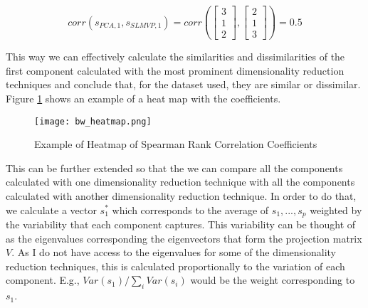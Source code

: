 $$
    corr(s_{PCA,1}, s_{SLMVP,1}) =
    corr \left(
    \begin{bmatrix}
            3 \\
            1 \\
            2
        \end{bmatrix},
    \begin{bmatrix}
            2 \\
            1 \\
            3
        \end{bmatrix}
    \right) = 0.5
$$

This way we can effectively calculate the similarities and dissimilarities of the first component calculated with the most prominent dimensionality reduction techniques and conclude that, for the dataset used, they are similar or dissimilar. Figure \ref{fig:bw-heatmap} shows an example of a heat map with the coefficients.

\begin{figure}[!h]
    \centering
    \texttt{[image: bw\_heatmap.png]}
    \caption{Example of Heatmap of Spearman Rank Correlation Coefficients}
    \label{fig:bw-heatmap}
\end{figure}

This can be further extended so that the we can compare all the components calculated with one dimensionality reduction technique with all the components calculated with another dimensionality reduction technique. In order to do that, we calculate a vector $s_1^*$ which corresponds to the average of $s_1, ..., s_p$ weighted by the variability that each component captures. This variability can be thought of as the eigenvalues corresponding the eigenvectors that form the projection matrix $V$. As I do not have access to the eigenvalues for some of the dimensionality reduction techniques, this is calculated proportionally to the variation of each component. E.g., $Var(s_1)/\sum_i Var(s_i)$ would be the weight corresponding to $s_1$.